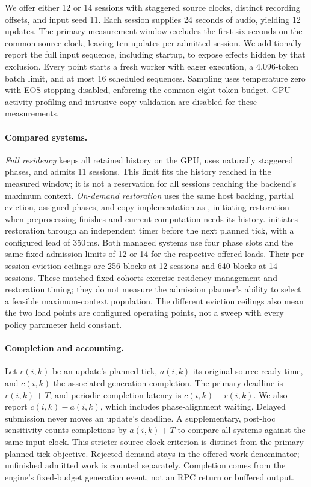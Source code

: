 We offer either 12 or 14 sessions with staggered source clocks, distinct recording offsets, and input seed 11.
Each session supplies 24 seconds of audio, yielding 12 updates.
The primary measurement window excludes the first six seconds on the common source clock, leaving ten updates per admitted session.
We additionally report the full input sequence, including startup, to expose effects hidden by that exclusion.
Every point starts a fresh worker with eager execution, a 4,096-token batch limit, and at most 16 scheduled sequences.
Sampling uses temperature zero with EOS stopping disabled, enforcing the common eight-token budget.
GPU activity profiling and intrusive copy validation are disabled for these measurements.

\paragraph{Compared systems.}
\emph{Full residency} keeps all retained history on the GPU, uses naturally staggered phases, and admits 11 sessions.
This limit fits the history reached in the measured window; it is not a reservation for all sessions reaching the backend's maximum context.
\emph{On-demand restoration} uses the same host backing, partial eviction, assigned phases, and copy implementation as \systemname, initiating restoration when preprocessing finishes and current computation needs its history.
\emph{\systemname} initiates restoration through an independent timer before the next planned tick, with a configured lead of 350\,ms.
Both managed systems use four phase slots and the same fixed admission limits of 12 or 14 for the respective offered loads.
Their per-session eviction ceilings are 256 blocks at 12 sessions and 640 blocks at 14 sessions.
These matched fixed cohorts exercise residency management and restoration timing; they do not measure the admission planner's ability to select a feasible maximum-context population.
The different eviction ceilings also mean the two load points are configured operating points, not a sweep with every policy parameter held constant.

\paragraph{Completion and accounting.}
Let $r(i,k)$ be an update's planned tick, $a(i,k)$ its original source-ready time, and $c(i,k)$ the associated generation completion.
The primary deadline is $r(i,k)+T$, and periodic completion latency is $c(i,k)-r(i,k)$.
We also report $c(i,k)-a(i,k)$, which includes phase-alignment waiting.
Delayed submission never moves an update's deadline.
A supplementary, post-hoc sensitivity counts completions by $a(i,k)+T$ to compare all systems against the same input clock.
This stricter source-clock criterion is distinct from the primary planned-tick objective.
Rejected demand stays in the offered-work denominator; unfinished admitted work is counted separately.
Completion comes from the engine's fixed-budget generation event, not an RPC return or buffered output.

